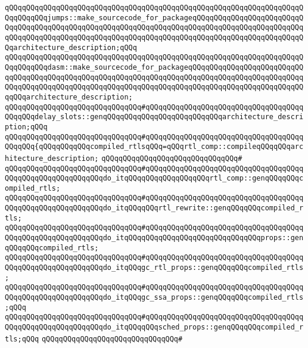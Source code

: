 \verb|qQQqqQQqqQQqqQQqqQQqqQQqqQQqqQQqqQQqqQQqqQQqqQQqqQQqqQQqqQQqqQQqqQQqqQQqqQQqqQQqjumps::make_sourcecode_for_packageqQQqqQQqqQQqqQQqqQQqqQQqqQQqqQQqqQQqqQQqqQQqqQQqqQQqqQQqqQQqqQQqqQQqqQQqqQQqqQQqqQQqqQQqqQQqqQQqqQQqqQQqqQQqqQQqqQQqqQQqqQQqqQQqqQQqqQQqqQQqqQQqqQQqqQQqqQQqqQQqqQQqqQQqarchitecture_description;qQQq|\newline
\verb|qQQqqQQqqQQqqQQqqQQqqQQqqQQqqQQqqQQqqQQqqQQqqQQqqQQqqQQqqQQqqQQqqQQqqQQqqQQqqQQqdasm::make_sourcecode_for_packageqQQqqQQqqQQqqQQqqQQqqQQqqQQqqQQqqQQqqQQqqQQqqQQqqQQqqQQqqQQqqQQqqQQqqQQqqQQqqQQqqQQqqQQqqQQqqQQqqQQqqQQqqQQqqQQqqQQqqQQqqQQqqQQqqQQqqQQqqQQqqQQqqQQqqQQqqQQqqQQqqQQqqQQqqQQqarchitecture_description;|\newline
\newline
\verb|qQQqqQQqqQQqqQQqqQQqqQQqqQQqqQQq#qQQqqQQqqQQqqQQqqQQqqQQqqQQqqQQqqQQqqQQqqQQqdelay_slots::genqQQqqQQqqQQqqQQqqQQqqQQqqQQqarchitecture_description;qQQq|\newline
\newline
\verb|qQQqqQQqqQQqqQQqqQQqqQQqqQQqqQQq#qQQqqQQqqQQqqQQqqQQqqQQqqQQqqQQqqQQqqQQqqQQq{qQQqqQQqqQQqcompiled_rtlsqQQq=qQQqrtl_comp::compileqQQqqQQqarchitecture_description;|\newline
\verb|qQQqqQQqqQQqqQQqqQQqqQQqqQQqqQQq#|\newline
\verb|qQQqqQQqqQQqqQQqqQQqqQQqqQQqqQQq#qQQqqQQqqQQqqQQqqQQqqQQqqQQqqQQqqQQqqQQqqQQqqQQqqQQqqQQqqQQqdo_itqQQqqQQqqQQqqQQqqQQqrtl_comp::genqQQqqQQqcompiled_rtls;|\newline
\verb|qQQqqQQqqQQqqQQqqQQqqQQqqQQqqQQq#qQQqqQQqqQQqqQQqqQQqqQQqqQQqqQQqqQQqqQQqqQQqqQQqqQQqqQQqqQQqdo_itqQQqqQQqrtl_rewrite::genqQQqqQQqcompiled_rtls;|\newline
\verb|qQQqqQQqqQQqqQQqqQQqqQQqqQQqqQQq#qQQqqQQqqQQqqQQqqQQqqQQqqQQqqQQqqQQqqQQqqQQqqQQqqQQqqQQqqQQqdo_itqQQqqQQqqQQqqQQqqQQqqQQqqQQqqQQqprops::genqQQqqQQqcompiled_rtls;|\newline
\verb|qQQqqQQqqQQqqQQqqQQqqQQqqQQqqQQq#qQQqqQQqqQQqqQQqqQQqqQQqqQQqqQQqqQQqqQQqqQQqqQQqqQQqqQQqqQQqdo_itqQQqgc_rtl_props::genqQQqqQQqcompiled_rtls;|\newline
\verb|qQQqqQQqqQQqqQQqqQQqqQQqqQQqqQQq#qQQqqQQqqQQqqQQqqQQqqQQqqQQqqQQqqQQqqQQqqQQqqQQqqQQqqQQqqQQqdo_itqQQqgc_ssa_props::genqQQqqQQqcompiled_rtls;qQQq|\newline
\verb|qQQqqQQqqQQqqQQqqQQqqQQqqQQqqQQq#qQQqqQQqqQQqqQQqqQQqqQQqqQQqqQQqqQQqqQQqqQQqqQQqqQQqqQQqqQQqdo_itqQQqqQQqsched_props::genqQQqqQQqcompiled_rtls;qQQq|\newline
\verb|qQQqqQQqqQQqqQQqqQQqqQQqqQQqqQQq#|\newline
